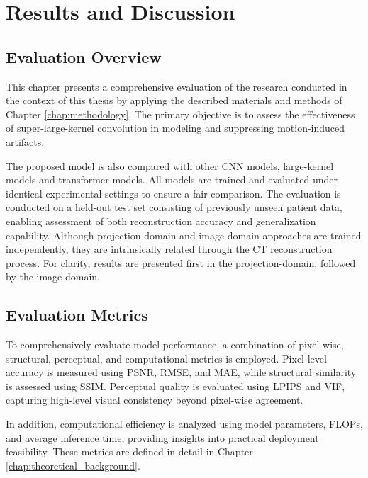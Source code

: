\chapter{Results and Discussion}
\label{chap:results}

\section{Evaluation Overview}
This chapter presents a comprehensive evaluation of the research conducted in the context of this thesis by applying the described materials and methods of Chapter \ref{chap:methodology}. The primary objective is to assess the effectiveness of super-large-kernel convolution in modeling and suppressing motion-induced artifacts.


The proposed model is also compared with other CNN models, large-kernel models and transformer models. All models are trained and evaluated under identical experimental settings to ensure a fair comparison. The evaluation is conducted on a held-out test set consisting of previously unseen patient data, enabling assessment of both reconstruction accuracy and generalization capability. 
Although projection-domain and image-domain approaches are trained independently, they are intrinsically related through the CT reconstruction process. For clarity, results are presented first in the projection-domain, followed by the image-domain.





 

 
\section{Evaluation Metrics}


To comprehensively evaluate model performance, a combination of pixel-wise, structural, perceptual, and computational metrics is employed. Pixel-level accuracy is measured using PSNR, RMSE, and MAE, while structural similarity is assessed using SSIM. Perceptual quality is evaluated using LPIPS and VIF, capturing high-level visual consistency beyond pixel-wise agreement.

In addition, computational efficiency is analyzed using model parameters, FLOPs, and  average inference time, providing insights into practical deployment feasibility. 
These metrics are defined in detail in Chapter \ref{chap:theoretical_background}. 

 

